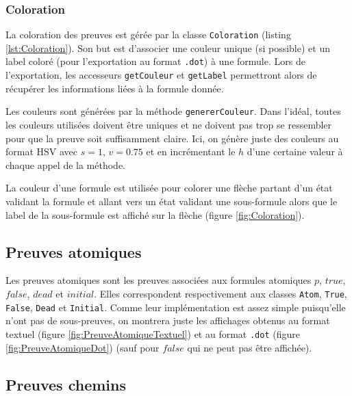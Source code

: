 \documentclass[dvipsnames]{report}
\begin{document}


\subsubsection{Coloration}

La coloration des preuves est gérée par la classe \texttt{Coloration} (listing \ref{lst:Coloration}). Son but est d'associer une couleur unique (si possible) et un label coloré (pour l'exportation au format \texttt{.dot}) à une formule. Lors de l'exportation, les accesseurs \texttt{getCouleur} et \texttt{getLabel} permettront alors de récupérer les informations liées à la formule donnée.

Les couleurs sont générées par la méthode \texttt{genererCouleur}. Dans l'idéal, toutes les couleurs utilisées doivent être uniques et ne doivent pas trop se ressembler pour que la preuve soit suffisamment claire. Ici, on génère juste des couleurs au format HSV avec $s=1$, $v=0.75$ et en incrémentant le $h$ d'une certaine valeur à chaque appel de la méthode.

La couleur d'une formule est utilisée pour colorer une flèche partant d'un état validant la formule et allant vers un état validant une sous-formule alors que le label de la sous-formule est affiché sur la flèche (figure \ref{fig:Coloration}).



\subsection{Preuves atomiques}

Les preuves atomiques sont les preuves associées aux formules atomiques $p$, $true$, $false$, $dead$ et $initial$. Elles correspondent respectivement aux classes \texttt{Atom}, \texttt{True}, \texttt{False}, \texttt{Dead} et \texttt{Initial}. Comme leur implémentation est assez simple puisqu'elle n'ont pas de sous-preuves, on montrera juste les affichages obtenus au format textuel (figure \ref{fig:PreuveAtomiqueTextuel}) et au format \texttt{.dot} (figure \ref{fig:PreuveAtomiqueDot}) (sauf pour $false$ qui ne peut pas être affichée).





\subsection{Preuves chemins}
\end{document}
